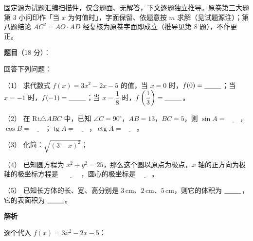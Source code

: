 

\begin{gktip}
固定源为试题汇编扫描件，仅含题面、无解答，下文逐题独立推导。原卷第三大题第 3 小问印作「当 $x$ 为何值时」，字面保留、依题意按 $m$ 求解（见试题源注）；第八题结论 $AC^2=AO\cdot AD$ 经复核为原卷字面即成立（推导见第 8 题），不作更正。
\end{gktip}

\begin{answer}

\textbf{题目}（18 分）：

回答下列问题：

（1） 求代数式 $f(x)=3x^2-2x-5$ 的值，当 $x=0$ 时，$f(0)=\underline{\hspace{2.5em}}$；当 $x=-1$ 时，$f(-1)=\underline{\hspace{2.5em}}$；当 $x=\dfrac18$ 时，$f\left(\dfrac13\right)=\underline{\hspace{2.5em}}$。

（2） 在 $\mathrm{Rt}\triangle ABC$ 中，已知 $\angle C=90^\circ$，$AB=13$，$BC=5$，则 $\sin A=\underline{\hspace{2em}}$，$\cos B=\underline{\hspace{2em}}$；$\operatorname{tg}A=\underline{\hspace{2em}}$，$\operatorname{ctg}A=\underline{\hspace{2em}}$。

（3） 化简：$\sqrt{(3-x)^2}$；

（4） 已知圆方程为 $x^2+y^2=25$，那么这个圆以原点为极点，$x$ 轴的正方向为极轴的极坐标方程是 $\underline{\hspace{3em}}$，圆心的极坐标是 $\underline{\hspace{2em}}$。

（5） 已知长方体的长、宽、高分别是 $3\,\mathrm{cm}$、$2\,\mathrm{cm}$、$5\,\mathrm{cm}$，则它的体积为 $\underline{\hspace{2.5em}}$，它的表面积为 $\underline{\hspace{2.5em}}$。

\textbf{解析}


逐个代入 $f(x)=3x^2-2x-5$：


\end{answer}
